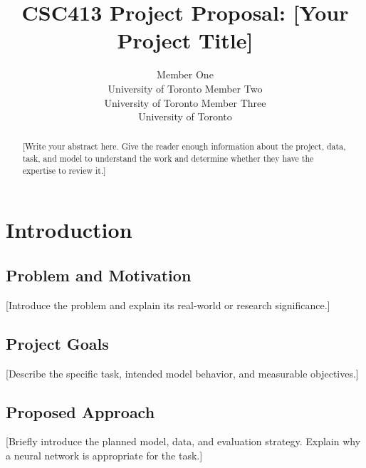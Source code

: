 \documentclass{article}
\title{CSC413 Project Proposal: [Your Project Title]}
\author{
  Member One \\
  University of Toronto
  \And
  Member Two \\
  University of Toronto
  \And
  Member Three \\
  University of Toronto
}
\begin{document}
\maketitle

\begin{abstract}

[Write your abstract here. Give the reader enough information about
the project, data, task, and model to understand the work and determine
whether they have the expertise to review it.]

\end{abstract}

\section{Introduction}


\subsection{Problem and Motivation}

[Introduce the problem and explain its real-world or research
significance.]

\subsection{Project Goals}

[Describe the specific task, intended model behavior, and measurable
objectives.]

\subsection{Proposed Approach}

[Briefly introduce the planned model, data, and evaluation strategy.
Explain why a neural network is appropriate for the task.]
\end{document}
